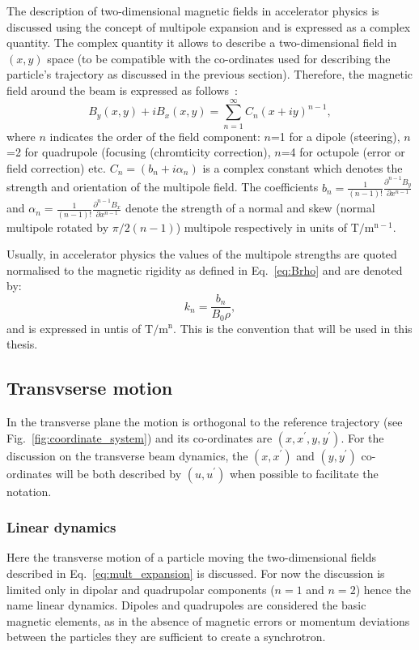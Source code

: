 The description of two-dimensional magnetic fields in accelerator physics is discussed using the concept of multipole expansion and is expressed as a complex quantity. The complex quantity it allows to describe a two-dimensional field in $(x,y)$ space (to be compatible with the co-ordinates used for describing the particle's trajectory as discussed in the previous section). Therefore, the magnetic field around the beam is expressed as follows~\cite{wolski2014}: 
\begin{equation}\label{eq:mult_expansion} %
    B_y(x,y) + i B_x(x,y) = \sum_{n=1}^{\infty} C_n (x+i y)^{n-1},
\end{equation} %
where $n$ indicates the order of the field component: $n$=1 for a dipole (steering), $n$=2 for quadrupole (focusing (chromticity correction), $n$=4 for octupole (error or field correction) etc. $C_n=(b_n +i \alpha_n)$ is a complex constant which denotes the strength and orientation of the multipole field. The coefficients $b_n=\frac{1}{(n-1)!} \frac{\partial^{n-1}B_y}{\partial x^{n-1}}$ and $\alpha_n=\frac{1}{(n-1)!} \frac{\partial^{n-1}B_x}{\partial x^{n-1}}$ denote the strength of a normal and skew (normal multipole rotated by $\pi/2(n-1)$) multipole respectively in units of $\mathrm{T/m^{n-1}}$.

Usually, in accelerator physics the values of the multipole strengths are quoted normalised to the magnetic rigidity as defined in Eq.~\eqref{eq:Brho} and are denoted by:
\begin{equation}\label{eq:kn}
    k_n = \frac{b_n}{B_0 \rho},
\end{equation}
and is expressed in untis of  $\mathrm{T/m^{n}}$. This is the convention that will be used in this thesis.

\subsection{Transvserse motion}
In the transverse plane the motion is orthogonal to the reference trajectory (see Fig.~\ref{fig:coordinate_system}) and its co-ordinates are $(x, x^\prime, y, y^\prime)$. For the discussion on the transverse beam dynamics, the $(x, x^\prime)$ and $(y, y^\prime)$ co-ordinates will be both described by $(u, u^\prime)$ when possible to facilitate the notation.

\subsubsection{Linear dynamics}
Here the transverse motion of a particle moving the two-dimensional fields described in Eq.~\eqref{eq:mult_expansion} is discussed. For now the discussion is limited only in dipolar and quadrupolar components ($n=1$ and $n=2$) hence the name linear dynamics. Dipoles and quadrupoles are considered the basic magnetic elements, as in the absence of magnetic errors or momentum deviations between the particles they are sufficient to create a synchrotron. 

